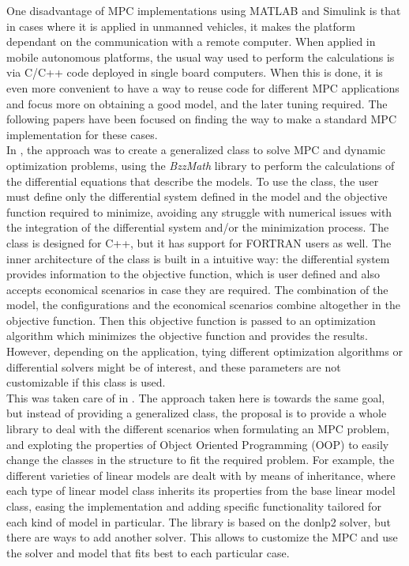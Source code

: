 One disadvantage of MPC implementations using MATLAB \textsuperscript{\textregistered} and Simulink \textsuperscript{\textregistered} is that in cases where it is applied in unmanned vehicles, it makes the platform dependant on the communication with a remote computer. When applied in mobile autonomous platforms, the usual way used to perform the calculations is via C/C++ code deployed in single board computers. When this is done, it is even more convenient to have a way to reuse code for different MPC applications and focus more on obtaining a good model, and the later tuning required. The following papers have been focused on finding the way to make a standard MPC implementation for these cases. \\

In \cite{Manenti2008}, the approach was to create a generalized class to solve MPC and dynamic optimization problems, using the \emph{BzzMath} library to perform the calculations of the differential equations that describe the models. To use the class, the user must define only the differential system defined in the model and the objective function required to minimize, avoiding any struggle with numerical issues with the integration of the differential system and/or the minimization process. The class is designed for C++, but it has support for FORTRAN users as well. The inner architecture of the class is built in a intuitive way: the differential system provides information to the objective function, which is user defined and also accepts economical scenarios in case they are required. The combination of the model, the configurations and the economical scenarios combine altogether in the objective function. Then this objective function is passed to an optimization algorithm which minimizes the objective function and provides the results. However, depending on the application, tying different optimization algorithms or differential solvers might be of interest, and these parameters are not customizable if this class is used.\\

This was taken care of in \cite{Rosendo2009}. The approach taken here is towards the same goal, but instead of providing a generalized class, the proposal is to provide a whole library to deal with the different scenarios when formulating an MPC problem, and exploting the properties of Object Oriented Programming (OOP) to easily change the classes in the structure to fit the required problem. For example, the different varieties of linear models are dealt with by means of inheritance, where each type of linear model class inherits its properties from the base linear model class, easing the implementation and adding specific functionality tailored for each kind of model in particular. The library is based on the donlp2 solver, but there are ways to add another solver. This allows to customize the MPC and use the solver and model that fits best to each particular case. \\

